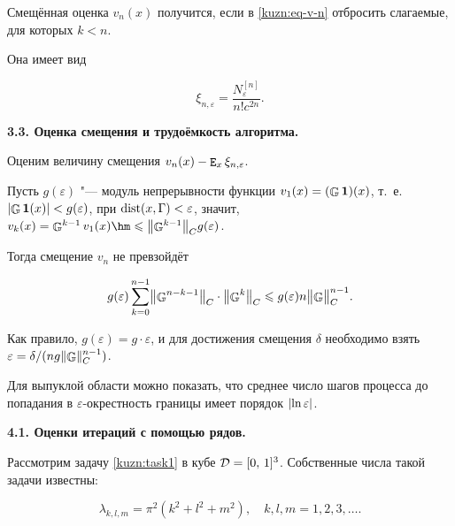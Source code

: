     Смещённая оценка $v_n(x)$ получится, если в \eqref{kuzn:eq-v-n} отбросить слагаемые, для которых $k<n$.

    Она имеет вид

    \begin{equation}\label{kuzn:eq-xi-n-e}

        \xi_{n, \varepsilon}=\frac{N_\varepsilon^{[n]}}{n!c^{2n}}.

    \end{equation}



{\bf 3.3. Оценка смещения и трудоёмкость алгоритма.}

    Оценим величину смещения $v_n(x)-\mathop{\tt E}\nolimits_x\xi_{n,\varepsilon}$.

    Пусть $g(\varepsilon)$ "--- модуль непрерывности функции $v_1(x)=(\mathop{\mathbb{G}}\nolimits\mathbf{1})(x)$, т.~е. ${\left|{\mathop{\mathbb{G}}\nolimits\mathbf{1}(x)}\right|<g(\varepsilon)}$, при ${\mathop{\rm dist}\nolimits(x, \Gamma)<\varepsilon}$, значит, $v_k(x)=\IGreen^{k-1}v_1(x)\hm\leqslant\norm{\IGreen^{k-1}}_Cg(\varepsilon)$.

    Тогда смещение $v_n$ не превзойдёт

    \[

        g(\varepsilon)\lsum_{k=0}^{n-1}\norm{\IGreen^{n-k-1}}_C\cdot\norm{\IGreen^k}_C\leqslant g(\varepsilon)n\norm{\IGreen}^{n-1}_C.

    \]



    Как правило, $g(\varepsilon)=g\cdot\varepsilon$, и для достижения смещения $\delta$ необходимо взять $\varepsilon={\delta} /({ng\|{\mathop{\mathbb{G}}\nolimits}\|^{n-1}_C})$.



    Для выпуклой области можно показать, что среднее число шагов процесса до попадания в $\varepsilon$-окрестность границы имеет порядок $\left|{\ln\varepsilon}\right|$.

    

\newpage




\smallskip

{\bf 4.1. Оценки итераций с помощью рядов.}

    Рассмотрим задачу \eqref{kuzn:task1} в кубе $\mathcal{D}=[0,\,1]^3$. Собственные числа такой задачи известны:

    \[

        \lambda_{k,l,m}=\pi^2(k^2+l^2+m^2), \quad k, l, m = 1, 2, 3, \ldots.

    \]

